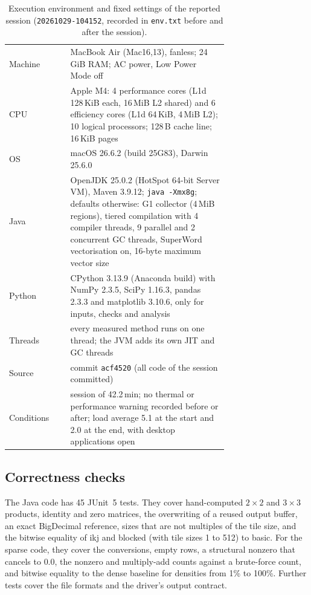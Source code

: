 \documentclass[11pt,a4paper]{article}
\newcommand{\session}{\texttt{20261029-104152}}
\begin{document}
\begin{table}[t]
\centering
\caption{Execution environment and fixed settings of the reported session
(\session, recorded in \texttt{env.txt} before and after the session).}
\label{tab:env}
\small
\begin{tabular}{@{}lp{0.72\linewidth}@{}}
\toprule
Machine & MacBook Air (Mac16,13), fanless; 24\,GiB RAM; AC power, Low Power Mode off \\
CPU & Apple M4: 4 performance cores (L1d 128\,KiB each, 16\,MiB L2 shared) and
6 efficiency cores (L1d 64\,KiB, 4\,MiB L2); 10 logical processors; 128\,B cache
line; 16\,KiB pages \\
OS & macOS 26.6.2 (build 25G83), Darwin 25.6.0 \\
Java & OpenJDK 25.0.2 (HotSpot 64-bit Server VM), Maven 3.9.12;
\texttt{java -Xmx8g}; defaults otherwise: G1 collector (4\,MiB regions), tiered
compilation with 4 compiler threads, 9 parallel and 2 concurrent GC threads,
SuperWord vectorisation on, 16-byte maximum vector size \\
Python & CPython 3.13.9 (Anaconda build) with NumPy 2.3.5, SciPy 1.16.3,
pandas 2.3.3 and matplotlib 3.10.6, only for inputs, checks and analysis \\
Threads & every measured method runs on one thread; the JVM adds its own JIT
and GC threads \\
Source & commit \texttt{acf4520} (all code of the session committed) \\
Conditions & session of 42.2\,min; no thermal or performance warning recorded
before or after; load average 5.1 at the start and 2.0 at the end, with
desktop applications open \\
\bottomrule
\end{tabular}
\end{table}

\subsection{Correctness checks}
\label{sec:correctness}

The Java code has 45 JUnit~5 tests. They cover hand-computed $2\times2$ and
$3\times3$ products, identity and zero matrices, the overwriting of a reused
output buffer, an exact BigDecimal reference, sizes that are not multiples of
the tile size, and the bitwise equality of ikj and blocked (with tile sizes 1 to
512) to basic. For the sparse code, they cover the conversions, empty rows, a
structural nonzero that cancels to $0.0$, the nonzero and multiply-add counts
against a brute-force count, and bitwise equality to the dense baseline for
densities from 1\% to 100\%. Further tests cover the file formats and the
driver's output contract.
\end{document}
